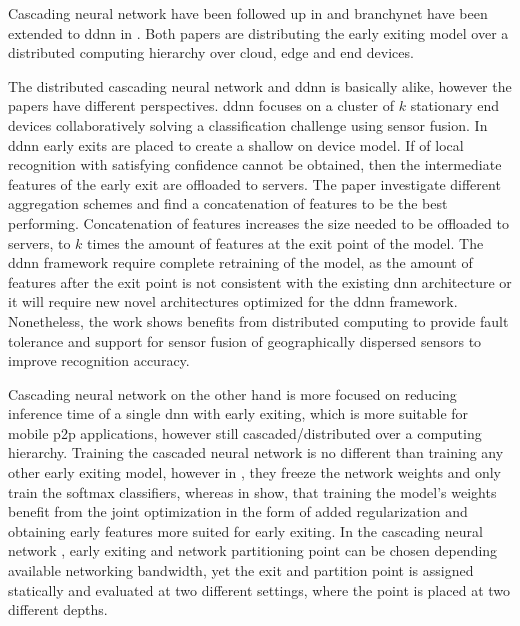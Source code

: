 Cascading neural network \cite{leroux_resource-constrained_2015} have been followed up in \cite{leroux_cascading_2017} and \gls{branchynet} have been extended to \gls{ddnn} in \cite{teerapittayanon_distributed_2017}. Both papers are distributing the early exiting model over a distributed computing hierarchy over cloud, edge and end devices.  

The distributed cascading neural network and \gls{ddnn} is basically alike, however the papers have different perspectives. \gls{ddnn} focuses on a cluster of $k$ stationary end devices collaboratively solving a classification challenge using sensor fusion. In \gls{ddnn}  early exits are placed to create a shallow on device model. If of local recognition with satisfying confidence cannot be obtained, then the intermediate features of the early exit are offloaded to servers. The paper investigate different aggregation schemes and find a concatenation of features to be the best performing. Concatenation of features increases the size needed to be offloaded to servers, to $k$ times the amount of features at the exit point of the model. The \gls{ddnn} framework require complete retraining of the model, as the amount of features after the exit point is not consistent with the existing \gls{dnn} architecture or it will require new novel architectures optimized for the \gls{ddnn} framework. Nonetheless, the work shows benefits from distributed computing to provide fault tolerance and support for sensor fusion of geographically dispersed sensors to improve recognition accuracy.

Cascading neural network \cite{leroux_cascading_2017} on the other hand is more focused on reducing inference time of a single \gls{dnn} with early exiting, which is more suitable for mobile \gls{p2p} applications, however still cascaded/distributed over a computing hierarchy. Training the cascaded neural network is no different than training any other early exiting model, however in \cite{leroux_cascading_2017}, they freeze the network weights and only train the softmax classifiers, whereas in \cite{teerapittayanon_branchynet:_2016} show, that training the model's weights benefit from the joint optimization in the form of added regularization and obtaining early features more suited for early exiting. In the cascading neural network \cite{leroux_cascading_2017}, early exiting and network partitioning point can be chosen depending available networking bandwidth, yet the exit and partition point is assigned statically and evaluated at two different settings, where the point is placed at two different depths. 

